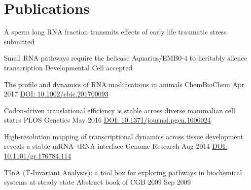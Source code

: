 \documentclass{klmr-cv}
\begin{document}
\section{Publications}


\begin{bibliography}
    {A sperm long RNA fraction transmits effects of early life traumatic stress}
    {}
    {submitted}
    {}

    {Small RNA pathways require the helicase Aquarius/EMB0-4 to heritably
        silence transcription}
    {Developmental Cell}
    {accepted}
    {}

    {The profile and dynamics of RNA modifications in animals}
    {ChemBioChem}
    {Apr 2017}
    {\href{http://dx.doi.org/10.1002/cbic.201700093}{DOI:
        10.1002/cbic.201700093}}

    {Codon-driven translational efficiency is stable across diverse mammalian
        cell states}
    {PLOS Genetics}
    {May 2016}
    {\href{http://dx.doi.org/10.1371/journal.pgen.1006024}{DOI:
        10.1371/journal.pgen.1006024}}

    {High-resolution mapping of transcriptional dynamics across tissue
        development reveals a stable mRNA--tRNA interface}
    {Genome Research}
    {Aug 2014}
    {\href{http://dx.doi.org/10.1101/gr.176784.114}{DOI: 10.1101/gr.176784.114}}

    {TInA (T-Invariant Analysis): a tool box for exploring pathways in
        biochemical systems at steady state}
    {Abstract book of CGB 2009}
    {Sep 2009}
    {}
\end{bibliography}
\end{document}
